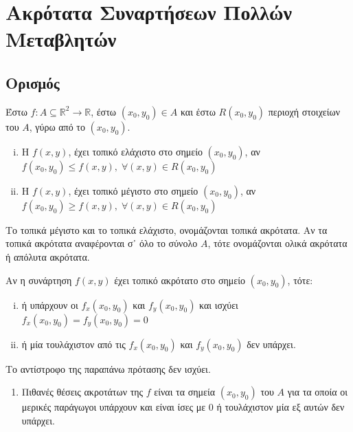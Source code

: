 


\everymath{\displaystyle}



\chapter{Ακρότατα Συναρτήσεων Πολλών Μεταβλητών}

\section{Ορισμός}

\begin{dfn}
\item {}
    Έστω $ f \colon A \subseteq \mathbb{R}^{2} \to \mathbb{R} $, έστω 
    $ (x_{0}, y_{0}) \in A $ και έστω $R(x_{0}, y_{0}) $ περιοχή στοιχείων του $A$, 
    γύρω από το $ (x_{0}, y_{0}) $.
    \begin{enumerate}[i)]
        \item 
            Η $ f(x,y) $, έχει τοπικό ελάχιστο στο σημείο $ (x_{0}, y_{0}) $, αν 
            $ f(x_{0}, y_{0}) \leq f(x,y), \; \forall (x,y) \in R(x_{0}, y_{0}) $ 
        \item 
            Η $ f(x,y) $, έχει τοπικό μέγιστο στο σημείο $ (x_{0}, y_{0}) $, αν 
            $ f(x_{0}, y_{0}) \geq f(x,y), \; \forall (x,y) \in R(x_{0}, y_{0}) $ 
    \end{enumerate}
Το τοπικά μέγιστο και το τοπικά ελάχιστο, ονομάζονται τοπικά ακρότατα. Αν τα τοπικά 
ακρότατα αναφέρονται σ᾽ όλο το σύνολο $A$, τότε ονομάζονται ολικά ακρότατα ή απόλυτα 
ακρότατα.
\end{dfn}

\begin{prop}
    Αν η συνάρτηση $ f(x,y) $ έχει τοπικό ακρότατο στο σημείο $ (x_{0}, y_{0}) $, 
    τότε:
    \begin{enumerate}[i)]
        \item ή υπάρχουν οι $ f_{x}(x_{0}, y_{0}) $ και $ f_{y}(x_{0}, y_{0}) $ 
            και ισχύει $ f_{x}(x_{0}, y_{0}) = f_{y}(x_{0}, y_{0} )=0 $
        \item ή μία τουλάχιστον από τις $ f_{x}(x_{0}, y_{0}) $ και 
            $ f_{y}(x_{0}, y_{0}) $ δεν υπάρχει.
    \end{enumerate}
\end{prop}

\begin{rem}
   Το αντίστροφο της παραπάνω πρότασης δεν ισχύει. 
\end{rem}

\begin{rems}
\item {}
    \begin{enumerate}
        \item Πιθανές θέσεις ακροτάτων της $f$ είναι τα σημεία $ (x_{0}, y_{0}) $ 
            του $A$ για τα οποία οι μερικές παράγωγοι υπάρχουν και είναι ίσες με 0 
            ή τουλάχιστον μία εξ αυτών δεν υπάρχει.
    \end{enumerate}
\end{rems}




